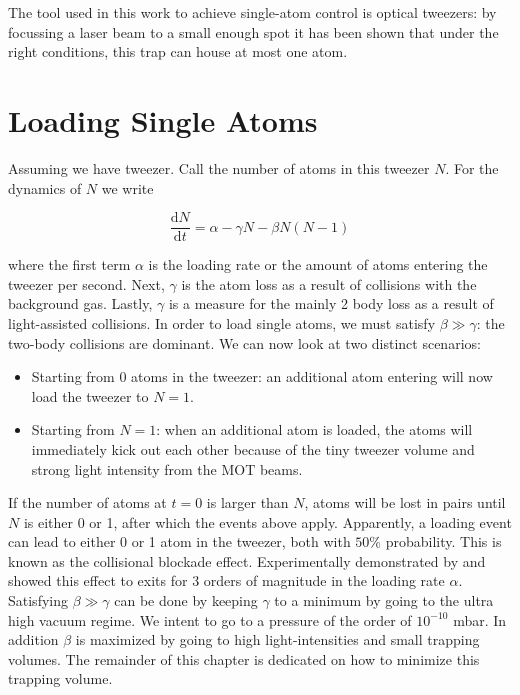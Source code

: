 The tool used in this work to achieve single-atom control is optical tweezers: by focussing a laser beam to a small enough spot it has been shown that under the right conditions, this trap can house at most one atom. 

\section{Loading Single Atoms}\label{sec:LoadingAtoms}

Assuming we have tweezer. Call the number of atoms in this tweezer $N$. For the dynamics of $N$ we write \cite{Schlosser2002}

\begin{equation}\label{LoadingTweezer}
	\frac{\text{d}N}{\text{d}t} = \alpha - \gamma N - \beta N(N-1)
\end{equation}

where the first term $\alpha$ is the loading rate or the amount of atoms entering the tweezer per second. Next, $\gamma$ is the atom loss as a result of collisions with the background gas. Lastly, $\gamma$ is a measure for the mainly 2 body loss as a result of light-assisted collisions. In order to load single atoms, we must satisfy $\beta \gg \gamma$: the two-body collisions are dominant. We can now look at two distinct scenarios:

\begin{itemize}
	\item Starting from 0 atoms in the tweezer: an additional atom entering will now load the tweezer to $N=1$. 
	
	\item Starting from $N=1$: when an additional atom is loaded, the atoms will immediately kick out each other because of the tiny tweezer volume and strong light intensity from the MOT beams. 
\end{itemize}

If the number of atoms at $t=0$ is larger than $N$, atoms will be lost in pairs until $N$ is either 0 or 1, after which the events above apply. Apparently, a loading event can lead to either 0 or 1 atom in the tweezer, both with $50\%$ probability. This is known as the collisional blockade effect. Experimentally demonstrated by \cite{Schlosser2001} and \cite{Schlosser2002} showed this effect to exits for 3 orders of magnitude in the loading rate $\alpha$. Satisfying $\beta \gg \gamma$ can be done by keeping $\gamma$ to a minimum by going to the ultra high vacuum regime. We intent to go to a pressure of the order of $10^{-10}$ mbar. In addition $\beta$ is maximized by going to high light-intensities and small trapping volumes. The remainder of this chapter is dedicated on how to minimize this trapping volume.

